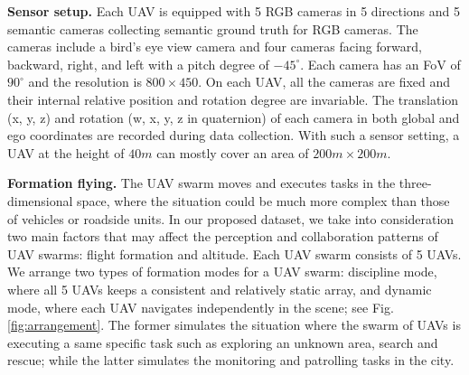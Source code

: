 \textbf{Sensor setup.}
Each UAV is equipped with 5 RGB cameras in 5 directions and 5 semantic cameras collecting semantic ground truth for RGB cameras. The cameras include a bird's eye view camera and four cameras facing forward, backward, right, and left with a pitch degree of $-45^\circ$. Each camera has an FoV of $90^\circ$ and the resolution is $800 \times 450$. On each UAV, all the cameras are fixed and their internal relative position and rotation degree are invariable. The translation (x, y, z) and rotation (w, x, y, z in quaternion) of each camera in both global and ego coordinates are recorded during data collection. With such a sensor setting, a UAV at the height of $40m$ can mostly cover an area of $200m \times 200m$.



\textbf{Formation flying.}
The UAV swarm moves and executes tasks in the three-dimensional space, where the situation could be much more complex than those of vehicles or roadside units. In our proposed dataset, we take into consideration two main factors that may affect the perception and collaboration patterns of UAV swarms: flight formation and altitude. Each UAV swarm consists of 5 UAVs. We arrange two types of formation modes for a UAV swarm: discipline mode, where all 5 UAVs keeps a consistent and relatively static array, and dynamic mode, where each UAV navigates independently in the scene; see Fig. \ref{fig:arrangement}. The former simulates the situation where the swarm of UAVs is executing a same specific task such as exploring an unknown area, search and rescue; while the latter simulates the monitoring and patrolling tasks in the city. 


